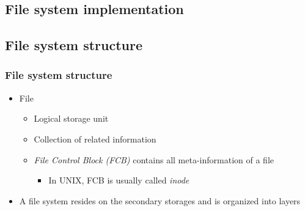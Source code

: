 \documentclass[CJKutf8,xcolor=pdftex,dvipsnames,table]{beamer}
\begin{document}
\begin{CJK*}{UTF8}{song}
  \section{File system implementation}

  \subsection{File system structure}

  \begin{frame}
    \frametitle{File system structure} \pause
    \begin{itemize}\parskip=0pt
    \item File \pause
      \begin{itemize}\parskip=0pt
      \item Logical storage unit \pause
      \item Collection of related information \pause
      \item \emph{File Control Block (FCB)} contains all meta-information of a file \pause
        \begin{itemize}\parskip=0pt
        \item In UNIX, FCB is usually called \emph{inode} \pause
        \end{itemize}
      \end{itemize}
    \item A file system resides on the secondary storages and is organized into layers
    \end{itemize}
  \end{frame}


\end{CJK*}
\end{document}
